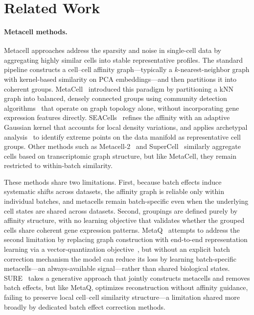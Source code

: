 \section{Related Work}

\paragraph{Metacell methods.}
Metacell approaches address the sparsity and noise in single-cell data by aggregating highly similar cells into stable representative profiles.
The standard pipeline constructs a cell--cell affinity graph---typically a $k$-nearest-neighbor graph with kernel-based similarity on PCA embeddings---and then partitions it into coherent groups.
MetaCell~\citep{metacell} introduced this paradigm by partitioning a kNN graph into balanced, densely connected groups using community detection algorithms~\citep{louvain, traag2019leiden} that operate on graph topology alone, without incorporating gene expression features directly.
SEACells~\citep{seacells} refines the affinity with an adaptive Gaussian kernel that accounts for local density variations, and applies archetypal analysis~\citep{cutler1994archetypal} to identify extreme points on the data manifold as representative cell groups.
Other methods such as Metacell-2~\citep{metacell2} and SuperCell~\citep{supercell} similarly aggregate cells based on transcriptomic graph structure, but like MetaCell, they remain restricted to within-batch similarity.

These methods share two limitations.
First, because batch effects induce systematic shifts across datasets, the affinity graph is reliable only within individual batches, and metacells remain batch-specific even when the underlying cell states are shared across datasets.
Second, groupings are defined purely by affinity structure, with no learning objective that validates whether the grouped cells share coherent gene expression patterns.
MetaQ~\citep{metaq} attempts to address the second limitation by replacing graph construction with end-to-end representation learning via a vector-quantization objective~\citep{vqvae}, but without an explicit batch correction mechanism the model can reduce its loss by learning batch-specific metacells---an always-available signal---rather than shared biological states.
SURE~\citep{sure} takes a generative approach that jointly constructs metacells and removes batch effects, but like MetaQ, optimizes reconstruction without affinity guidance, failing to preserve local cell--cell similarity structure---a limitation shared more broadly by dedicated batch effect correction methods.

